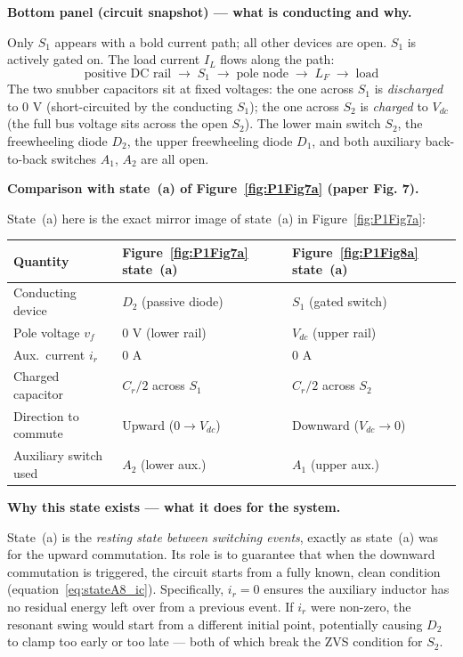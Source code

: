 \documentclass[12pt, a4paper]{article}
\def\,{ }%
\newcommand{\Vdc}{V_{dc}}
\newcommand{\vf}{v_f}
\newcommand{\ir}{i_r}
\newcommand{\IL}{I_L}
\newcommand{\Cr}{C_r}
\newcommand{\figref}[1]{Figure~\ref{#1}}
\begin{document}
\medskip
\textbf{Bottom panel (circuit snapshot) --- what is conducting and why.}

Only $S_1$ appears with a bold current path; all other devices are open.
$S_1$ is actively gated on.
The load current $\IL$ flows along the path:
\[
    \text{positive DC rail} \;\longrightarrow\; S_1 \;\longrightarrow\;
    \text{pole node} \;\longrightarrow\; L_F \;\longrightarrow\; \text{load}
\]
The two snubber capacitors sit at fixed voltages: the one across $S_1$ is
\emph{discharged} to 0\,V (short-circuited by the conducting $S_1$); the one
across $S_2$ is \emph{charged} to $\Vdc$ (the full bus voltage sits across the
open $S_2$).
The lower main switch $S_2$, the freewheeling diode $D_2$, the upper
freewheeling diode $D_1$, and both auxiliary back-to-back switches $A_1$,
$A_2$ are all open.

\medskip
\textbf{Comparison with state~(a) of \figref{fig:P1Fig7a} (paper Fig.\,7).}

State~(a) here is the exact mirror image of state~(a) in
\figref{fig:P1Fig7a}:

\begin{center}
\renewcommand{\arraystretch}{1.25}
\begin{tabular}{p{3.5cm} p{4.5cm} p{4.5cm}}
\toprule
\textbf{Quantity} & \textbf{\figref{fig:P1Fig7a} state~(a)} & \textbf{\figref{fig:P1Fig8a} state~(a)} \\
\midrule
Conducting device    & $D_2$ (passive diode)        & $S_1$ (gated switch) \\
Pole voltage $\vf$   & $0$\,V (lower rail)          & $\Vdc$ (upper rail) \\
Aux.\ current $\ir$  & $0$\,A                       & $0$\,A \\
Charged capacitor    & $\Cr/2$ across $S_1$         & $\Cr/2$ across $S_2$ \\
Direction to commute & Upward ($0 \to \Vdc$)        & Downward ($\Vdc \to 0$) \\
Auxiliary switch used & $A_2$ (lower aux.)           & $A_1$ (upper aux.) \\
\bottomrule
\end{tabular}
\end{center}

\medskip
\textbf{Why this state exists --- what it does for the system.}

State~(a) is the \emph{resting state between switching events}, exactly as
state~(a) was for the upward commutation.
Its role is to guarantee that when the downward commutation is triggered, the
circuit starts from a fully known, clean condition
(equation~\eqref{eq:stateA8_ic}).
Specifically, $\ir = 0$ ensures the auxiliary inductor has no residual energy
left over from a previous event.
If $\ir$ were non-zero, the resonant swing would start from a different initial
point, potentially causing $D_2$ to clamp too early or too late --- both of
which break the ZVS condition for $S_2$.
\end{document}
